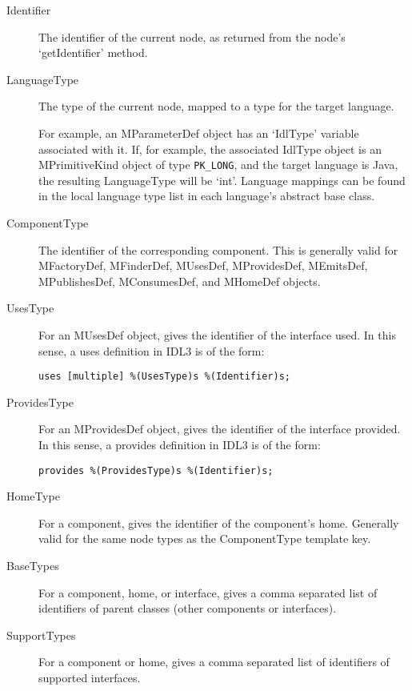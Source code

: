 \begin{description}

\item [Identifier] The identifier of the current node, as returned from the
      node's `getIdentifier' method.

\item [LanguageType] The type of the current node, mapped to a type for the
      target language.

      For example, an MParameterDef object has an `IdlType' variable associated
      with it. If, for example, the associated IdlType object is an
      MPrimitiveKind object of type {\tt PK\_LONG}, and the target language is
      Java, the resulting LanguageType will be `int'. Language mappings can be
      found in the local language type list in each language's abstract base
      class.

\item [ComponentType] The identifier of the corresponding component. This is
      generally valid for MFactoryDef, MFinderDef, MUsesDef, MProvidesDef,
      MEmitsDef, MPublishesDef, MConsumesDef, and MHomeDef objects.

\item [UsesType] For an MUsesDef object, gives the identifier of the interface
      used. In this sense, a uses definition in IDL3 is of the form:

\begin{verbatim}
uses [multiple] %(UsesType)s %(Identifier)s;
\end{verbatim}

\item [ProvidesType] For an MProvidesDef object, gives the identifier of the
      interface provided. In this sense, a provides definition in IDL3 is of the
      form:

\begin{verbatim}
provides %(ProvidesType)s %(Identifier)s;
\end{verbatim}

\item [HomeType] For a component, gives the identifier of the component's home.
      Generally valid for the same node types as the ComponentType template key.

\item [BaseTypes] For a component, home, or interface, gives a comma separated
      list of identifiers of parent classes (other components or interfaces).

\item [SupportTypes] For a component or home, gives a comma separated list of
      identifiers of supported interfaces.

\end{description}

